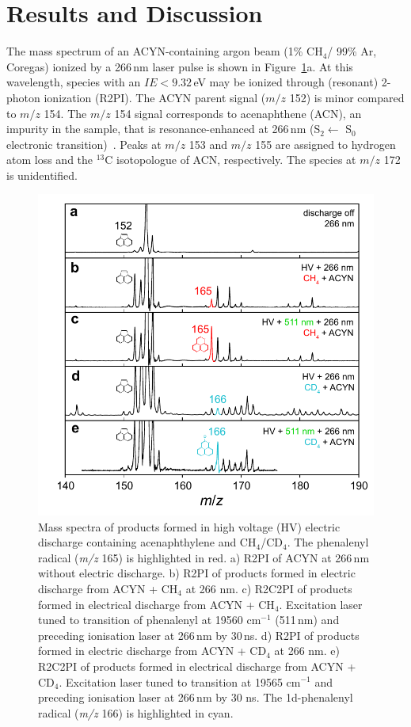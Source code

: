 \documentclass[journal=jacsat,manuscript=article,layout=onecolumn]{achemso}
\begin{document}
\section{Results and Discussion}

The mass spectrum of an ACYN-containing argon beam (1\% CH$_4$/ 99\% Ar, Coregas) ionized by a 266\,nm laser pulse is shown in Figure~\ref{fig1}a. At this wavelength, species with an $IE < 9.32$\,eV may be ionized through (resonant) 2-photon ionization (R2PI). The ACYN parent signal ($m/z$ 152) is minor compared to $m/z$ 154. The $m/z$ 154 signal corresponds to acenaphthene (ACN), an impurity in the sample, that is resonance-enhanced at 266\,nm (S$_2 \leftarrow$ S$_0$ electronic transition)~\cite{swi91}. Peaks at $m/z$ 153 and $m/z$ 155 are assigned to hydrogen atom loss and the $^{13}$C isotopologue of ACN, respectively. The species at $m/z$ 172 is unidentified.

\begin{figure}[h!]
	\includegraphics[width=15cm]{Figures/Figure1}
	\caption{Mass spectra of products formed in high voltage (HV) electric discharge containing acenaphthylene and CH$_4$/CD$_4$. The phenalenyl radical (\textit{m/z} 165) is highlighted in red. a) R2PI of ACYN at 266\,nm without electric discharge. b) R2PI of products formed in electric discharge from ACYN + CH$_4$ at 266 nm. c) R2C2PI of products formed in electrical discharge from ACYN + CH$_4$. Excitation laser tuned to transition of phenalenyl at 19560 cm$^{-1}$ (511\,nm) and preceding ionisation laser at 266\,nm by 30\,ns. d) R2PI of products formed in electric discharge from ACYN + CD$_4$ at 266 nm. e) R2C2PI of products formed in electrical discharge from ACYN + CD$_4$. Excitation laser tuned to transition at 19565 cm$^{-1}$ and preceding ionisation laser at 266\,nm by 30 ns. The 1d-phenalenyl radical (\textit{m/z} 166) is highlighted in cyan.}
	\label{fig1}
\end{figure}
\end{document}

